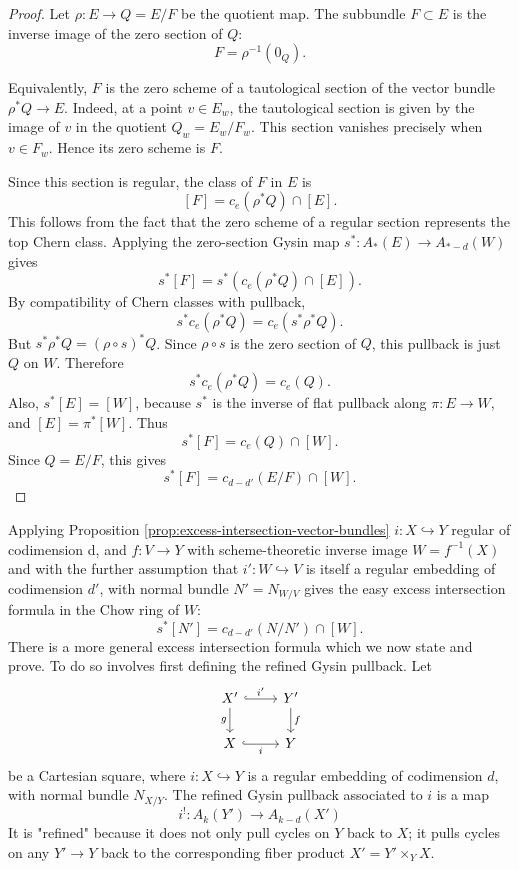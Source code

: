 \documentclass[12pt]{article}
\begin{document}
\begin{proof}
Let $\rho:E\to Q=E/F$ be the quotient map. The subbundle $F\subset E$ is the inverse image of the zero section of $Q$:
$$F=\rho^{-1}(0_Q).$$

Equivalently, $F$ is the zero scheme of a tautological section of the vector bundle $\rho^*Q\to E$. Indeed, at a point $v\in E_w$, the tautological section is given by the image of $v$ in the quotient $Q_w=E_w/F_w$. This section vanishes precisely when $v\in F_w$. Hence its zero scheme is $F$.

Since this section is regular, the class of $F$ in $E$ is
$$[F] = c_e(\rho^*Q)\cap [E].$$ This follows from the fact that the zero scheme of a regular section represents the top Chern class.
Applying the zero-section Gysin map $s^*:A_*(E)\to A_{*-d}(W)$ gives
$$s^*[F] = s^*\left(c_e(\rho^*Q)\cap [E]\right).$$
By compatibility of Chern classes with pullback,
$$s^*c_e(\rho^*Q) = c_e(s^*\rho^*Q).$$
But $s^*\rho^*Q = (\rho\circ s)^*Q$. Since $\rho\circ s$ is the zero section of $Q$, this pullback is just $Q$ on $W$. Therefore
$$s^*c_e(\rho^*Q) = c_e(Q).$$
Also, $s^*[E]=[W]$, because $s^*$ is the inverse of flat pullback along $\pi:E\to W$, and $[E]=\pi^*[W]$. Thus
$$s^*[F] = c_e(Q)\cap [W].$$
Since $Q=E/F$, this gives
$$s^*[F] = c_{d-d'}(E/F)\cap [W]. $$
\end{proof}

Applying Proposition \ref{prop:excess-intersection-vector-bundles}
$i:X\hookrightarrow Y$ regular of codimension d, and $f:V\to Y$ with scheme-theoretic inverse image $W=f^{-1}(X)$ and with the further assumption that $i':
W\hookrightarrow V$ is itself a regular embedding of codimension $d'$, with normal bundle $N'=N_{W/V}$ gives the easy excess intersection formula in the Chow ring of $W$:
\[s^*[N']
=
c_{d-d'}(N/N')\cap [W].\]
There is a more general excess intersection formula which we now state and prove. To do so involves first defining the refined Gysin pullback. Let
\[
\begin{tikzcd}
X' \arrow[r, hook, "i'"] \arrow[d,"g"'] & Y' \arrow[d,"f"] \\
X \arrow[r, hook, "i"'] & Y
\end{tikzcd}
\]
be a Cartesian square, where $i:X\hookrightarrow Y$ is a regular embedding of codimension $d$, with normal bundle $N_{X/Y}$. The refined Gysin pullback associated to $i$ is a map \[i^!:A_k(Y')\longrightarrow A_{k-d}(X')\] It is "refined" because it does not only pull cycles on $Y$ back to $X$; it pulls cycles on any $Y'\to Y$ back to the corresponding fiber product $X'=Y'\times_Y X$.
\end{document}
